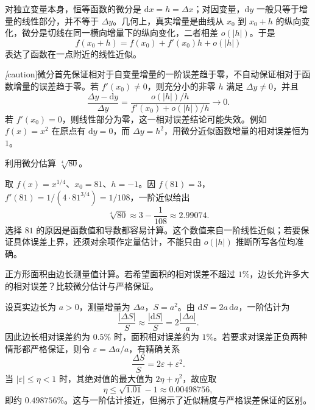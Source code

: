 \documentclass[UTF8,12pt,a4paper,fontset=fandol]{ctexbook}
\begin{document}
对独立变量本身，恒等函数的微分是 $\mathrm dx=h=\Delta x$；对因变量，$\mathrm dy$ 一般只等于增量的线性部分，并不等于 $\Delta y$。几何上，真实增量是曲线从 $x_0$ 到 $x_0+h$ 的纵向变化，微分是切线在同一横向增量下的纵向变化，二者相差 $o(|h|)$。于是
\begin{equation}
\label{eq:differential-linear-approximation}
    f(x_0+h)=f(x_0)+f'(x_0)h+o(|h|)
\end{equation}
表达了函数在一点附近的线性近似。

\emph[caution]{微分首先保证相对于自变量增量的一阶误差趋于零，不自动保证相对于函数增量的误差趋于零。}若 $f'(x_0)\ne0$，则充分小的非零 $h$ 满足 $\Delta y\ne0$，并且
\[
    \frac{\Delta y-\mathrm dy}{\Delta y}
    =\frac{o(|h|)/h}{f'(x_0)+o(|h|)/h}\longrightarrow0.
\]
若 $f'(x_0)=0$，则线性部分为零，这一相对误差结论可能失效。例如 $f(x)=x^2$ 在原点有 $\mathrm dy=0$，而 $\Delta y=h^2$，用微分近似函数增量的相对误差恒为 $1$。

\begin{example}
\label{ex:fourth-root-linear-approximation}
利用微分估算 $\sqrt[4]{80}$。
\end{example}
\begin{solve}
取 $f(x)=x^{1/4}$、$x_0=81$、$h=-1$。因 $f(81)=3$，$f'(81)=1/(4\cdot81^{3/4})=1/108$，一阶近似给出
\[
    \sqrt[4]{80}\approx3-\frac1{108}\approx2.99074.
\]
选择 $81$ 的原因是函数值和导数都容易计算。这个数值来自一阶线性近似；若要保证具体误差上界，还须对余项作定量估计，不能只由 $o(|h|)$ 推断所写各位均准确。
\end{solve}

\begin{example}
\label{ex:square-area-relative-error-differential}
正方形面积由边长测量值计算。若希望面积的相对误差不超过 $1\%$，边长允许多大的相对误差？比较微分估计与严格保证。
\end{example}
\begin{solve}
设真实边长为 $a>0$，测量增量为 $\Delta a$，$S=a^2$。由 $\mathrm dS=2a\,\mathrm da$，一阶估计为
\[
    \frac{|\Delta S|}{S}\approx\frac{|\mathrm dS|}{S}
    =2\frac{|\Delta a|}a.
\]
因此边长相对误差约为 $0.5\%$ 时，面积相对误差约为 $1\%$。若要求对误差正负两种情形都严格保证，则令 $\varepsilon=\Delta a/a$，有精确关系
\[
    \frac{\Delta S}{S}=2\varepsilon+\varepsilon^2.
\]
当 $|\varepsilon|\leq\eta<1$ 时，其绝对值的最大值为 $2\eta+\eta^2$，故应取
\[
    \eta\leq\sqrt{1.01}-1\approx0.00498756,
\]
即约 $0.498756\%$。这与一阶估计接近，但揭示了近似精度与严格误差保证的区别。
\end{solve}
\end{document}
